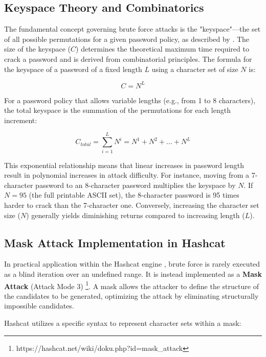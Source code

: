 \subsection{Keyspace Theory and Combinatorics}

The fundamental concept governing brute force attacks is the "keyspace"—the set of all possible permutations for a given password policy, as described by \cite{brute_force_math}. The size of the keyspace ($C$) determines the theoretical maximum time required to crack a password and is derived from combinatorial principles. The formula for the keyspace of a password of a fixed length $L$ using a character set of size $N$ is:

\begin{equation}
    C=N^L
\end{equation}

For a password policy that allows variable lengths (e.g., from 1 to 8 characters), the total keyspace is the summation of the permutations for each length increment:

\begin{equation}
    C_{total}=\sum_{i=1}^L N^i=N^1+N^2+...+N^L
\end{equation}

This exponential relationship means that linear increases in password length result in polynomial increases in attack difficulty. For instance, moving from a 7-character password to an 8-character password multiplies the keyspace by $N$. If $N=95$ (the full printable ASCII set), the 8-character password is 95 times harder to crack than the 7-character one. Conversely, increasing the character set size ($N$) generally yields diminishing returns compared to increasing length ($L$).

\subsection{Mask Attack Implementation in Hashcat}

In practical application within the Hashcat engine \cite{hashcat_wiki}, brute force is rarely executed as a blind iteration over an undefined range. It is instead implemented as a \textbf{Mask Attack} (Attack Mode 3) \footnote{https://hashcat.net/wiki/doku.php?id=mask\_attack}. A mask allows the attacker to define the structure of the candidates to be generated, optimizing the attack by eliminating structurally impossible candidates.

Hashcat utilizes a specific syntax to represent character sets within a mask:

